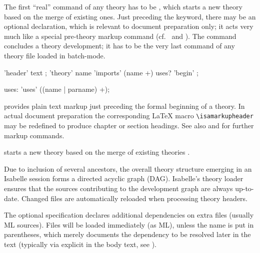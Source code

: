 \begin{isabellebody}
\begin{isamarkuptext}
  The first ``real'' command of any theory has to be \mbox{}, which starts a new theory based on the merge of existing
  ones.  Just preceding the \mbox{} keyword, there may be
  an optional \mbox{} declaration, which is relevant to
  document preparation only; it acts very much like a special
  pre-theory markup command (cf.\  and
  ).  The \mbox{} command concludes a
  theory development; it has to be the very last command of any theory
  file loaded in batch-mode.

  \begin{rail}
    'header' text
    ;
    'theory' name 'imports' (name +) uses? 'begin'
    ;

    uses: 'uses' ((name | parname) +);
  \end{rail}

  \begin{descr}

  \item [\mbox{\isa{\isacommand{header}}}~\isa{text}] provides plain text
  markup just preceding the formal beginning of a theory.  In actual
  document preparation the corresponding {\LaTeX} macro \verb|\isamarkupheader| may be redefined to produce chapter or section
  headings.  See also  and
   for further markup commands.
  
  \item [\mbox{\isa{\isacommand{theory}}}~\isa{A\ {\isasymIMPORTS}\ B\isactrlsub {\isadigit{1}}\ {\isasymdots}\ B\isactrlsub n\ {\isasymBEGIN}}] starts a new theory  based on the
  merge of existing theories .
  
  Due to inclusion of several ancestors, the overall theory structure
  emerging in an Isabelle session forms a directed acyclic graph
  (DAG).  Isabelle's theory loader ensures that the sources
  contributing to the development graph are always up-to-date.
  Changed files are automatically reloaded when processing theory
  headers.
  
  The optional \mbox{} specification declares additional
  dependencies on extra files (usually ML sources).  Files will be
  loaded immediately (as ML), unless the name is put in parentheses,
  which merely documents the dependency to be resolved later in the
  text (typically via explicit \mbox{} in the body text,
  see ).
  

\end{descr}
\end{isamarkuptext}
\end{isabellebody}
